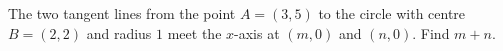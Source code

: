 The two tangent lines from the point $A=(3,5)$ to the circle with centre $B=(2,2)$ and radius $1$ meet the $x$-axis at $(m,0)$ and $(n,0)$. Find $m+n$.
